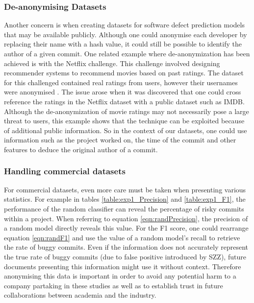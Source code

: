 \documentclass[../main.tex]{subfiles}
\begin{document}
\subsubsection{De-anonymising Datasets}

Another concern is when creating datasets for software defect prediction models that may be available publicly. Although one could anonymise each developer by replacing their name with a hash value, it could still be possible to identify the author of a given commit. One related example where de-anonymization has been achieved is with the Netflix challenge. This challenge involved designing recommender systems to recommend movies based on past ratings. The dataset for this challenged contained real ratings from users, however their usernames were anonymised \cite{naranyanan2008robust}. The issue arose when it was discovered that one could cross reference the ratings in the Netflix dataset with a public dataset such as IMDB. Although the de-anonymization of movie ratings may not necessarily pose a large threat to users, this example shows that the technique can be exploited because of additional public information. So in the context of our datasets, one could use information such as the project worked on, the time of the commit and other features to deduce the original author of a commit.

\subsubsection{Handling commercial datasets}

For commercial datasets, even more care must be taken when presenting various statistics. For example in tables \ref{table:exp1_Precision} and \ref{table:exp1_F1}, the performance of the random classifier can reveal the percentage of risky commits within a project. When referring to equation \ref{eqn:randPrecision}, the precision of a random model directly reveals this value. For the F1 score, one could rearrange equation \ref{eqn:randF1} and use the value of a random model's recall to retrieve the rate of buggy commits. Even if the information does not accurately represent the true rate of buggy commits (due to false positive introduced by SZZ), future documents presenting this information might use it without context. Therefore anonymising this data is important in order to avoid any potential harm to a company partaking in these studies as well as to establish trust in future collaborations between academia and the industry.
\end{document}
